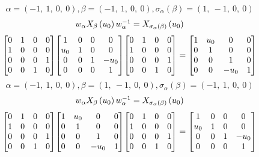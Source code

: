 \documentclass[11pt]{article}
\theoremstyle{definition}
\begin{document}
\[
\alpha = \left( -1, \  1, \  0, \  0\right), \beta = \left( -1, \  1, \  0, \  0\right), \sigma_{\alpha}(\beta) = \left( 1, \  -1, \  0, \  0\right)
\]
\[
\scaletoalign{\textwidth}{w_{\alpha} X_{\beta}\left(u_{0}\right) w_{\alpha}^{-1} = X_{\sigma_{\alpha}\left(\beta\right)}\left(u_{0}\right)}
\]
\[
\scaletoalign{\textwidth}{{\left[\begin{matrix}0 & 1 & 0 & 0\\1 & 0 & 0 & 0\\0 & 0 & 0 & 1\\0 & 0 & 1 & 0\end{matrix}\right]} {\left[\begin{matrix}1 & 0 & 0 & 0\\u_{0} & 1 & 0 & 0\\0 & 0 & 1 & - u_{0}\\0 & 0 & 0 & 1\end{matrix}\right]} {\left[\begin{matrix}0 & 1 & 0 & 0\\1 & 0 & 0 & 0\\0 & 0 & 0 & 1\\0 & 0 & 1 & 0\end{matrix}\right]} = {\left[\begin{matrix}1 & u_{0} & 0 & 0\\0 & 1 & 0 & 0\\0 & 0 & 1 & 0\\0 & 0 & - u_{0} & 1\end{matrix}\right]}}
\]
\[
\alpha = \left( -1, \  1, \  0, \  0\right), \beta = \left( 1, \  -1, \  0, \  0\right), \sigma_{\alpha}(\beta) = \left( -1, \  1, \  0, \  0\right)
\]
\[
\scaletoalign{\textwidth}{w_{\alpha} X_{\beta}\left(u_{0}\right) w_{\alpha}^{-1} = X_{\sigma_{\alpha}\left(\beta\right)}\left(u_{0}\right)}
\]
\[
\scaletoalign{\textwidth}{{\left[\begin{matrix}0 & 1 & 0 & 0\\1 & 0 & 0 & 0\\0 & 0 & 0 & 1\\0 & 0 & 1 & 0\end{matrix}\right]} {\left[\begin{matrix}1 & u_{0} & 0 & 0\\0 & 1 & 0 & 0\\0 & 0 & 1 & 0\\0 & 0 & - u_{0} & 1\end{matrix}\right]} {\left[\begin{matrix}0 & 1 & 0 & 0\\1 & 0 & 0 & 0\\0 & 0 & 0 & 1\\0 & 0 & 1 & 0\end{matrix}\right]} = {\left[\begin{matrix}1 & 0 & 0 & 0\\u_{0} & 1 & 0 & 0\\0 & 0 & 1 & - u_{0}\\0 & 0 & 0 & 1\end{matrix}\right]}}
\]
\end{document}
